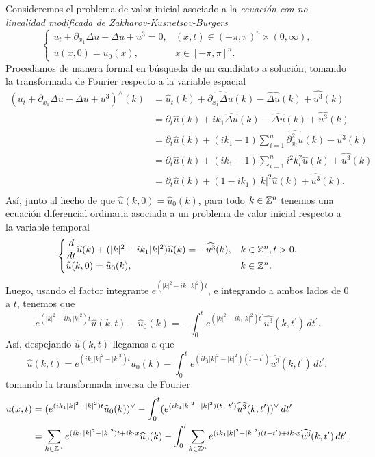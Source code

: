 Consideremos el problema de valor inicial asociado a la \textit{ecuación con no linealidad modificada de Zakharov-Kusnetsov-Burgers}
\begin{equation}\label{ZKB}
    \begin{cases}
    u_t+\partial_{x_1}\Delta u-\Delta u+u^3=0, & (x,t)\in(-\pi,\pi)^n\times(0,\infty),\\
    u(x,0)=u_0(x), & x\in[-\pi,\pi]^n.
\end{cases}
\end{equation}
Procedamos de manera formal en búsqueda de un candidato a solución, tomando la transformada de Fourier respecto a la variable espacial
\begin{align*}
   (u_t+\partial_{x_1}\Delta u-\Delta u+u^3)^{\wedge}(k)&= \widehat{u}_t(k)+\widehat{\partial_{x_1}\Delta u}(k)-\widehat{\Delta u}(k)+\widehat{u^3}(k)\\
   &=\partial_t\widehat{u}(k)+ik_1\widehat{\Delta u}(k)-\widehat{\Delta u}(k)+\widehat{u^3}(k)\\
   &=\partial_t\widehat{u}(k)+(ik_1-1)\sum_{i=1}^n\widehat{\partial^2_{x_i}u}(k)+\widehat{u^3}(k)\\
   &=\partial_t\widehat{u}(k)+(ik_1-1)\sum_{i=1}^ni^2k_i^2\widehat{u}(k)+\widehat{u^3}(k)\\
   &=\partial_t\widehat{u}(k)+(1-ik_1)|k|^2\widehat{u}(k)+\widehat{u^3}(k).\\
\end{align*}
Así, junto al hecho de que $\widehat{u}(k,0)=\widehat{u}_0(k)$, para todo $k\in\mathbb{Z}^n$ tenemos una ecuación diferencial ordinaria asociada a un problema de valor inicial respecto a la variable temporal 
$$\begin{cases}
    \dfrac{d}{dt}\widehat{u}(k)+(|k|^2-ik_1|k|^2)\widehat{u}(k)=-\widehat{u^3}(k), & k\in\mathbb{Z}^n,t>0.\\
    \widehat{u}(k,0)=\widehat{u}_0(k), &k\in\mathbb{Z}^{n}.
\end{cases}$$
Luego, usando el factor integrante $e^{(|k|^2-ik_1|k|^2)t}$, e integrando a ambos lados de 0 a $t$, tenemos que
$$e^{(|k|^2-ik_1|k|^2)t}\widehat{u}(k,t)-\widehat{u}_0(k)=-\int_0^te^{(|k|^2-ik_1|k|^2)t^\prime}\widehat{u^3}(k,t^\prime)\,dt^\prime.$$
Así, despejando $\widehat{u}(k,t)$ llegamos a que
$$\widehat{u}(k,t)=e^{(ik_1|k|^2-|k|^2)t}\widehat{u}_0(k)-\int_0^te^{(ik_1|k|^2-|k|^2)(t-t^\prime)}\widehat{u^3}(k,t^\prime)\,dt^\prime,$$
tomando la transformada inversa de Fourier 
\begin{align*}
    u(x,t)&=(e^{(ik_1|k|^2-|k|^2)t}\widehat{u}_0(k))^{\vee}-\int_0^t(e^{(ik_1|k|^2-|k|^2)(t-t^\prime)}\widehat{u^3}(k,t^\prime))^{\vee}\,dt^\prime\\
    &=\sum_{k\in\mathbb{Z}^n}e^{(ik_1|k|^2-|k|^2)t+ik\cdot x}\widehat{u}_0(k)-\int_0^t\sum_{k\in\mathbb{Z}^n}e^{(ik_1|k|^2-|k|^2)(t-t^\prime)+ik\cdot x}\widehat{u^3}(k,t^\prime)\,dt^\prime.
\end{align*}
